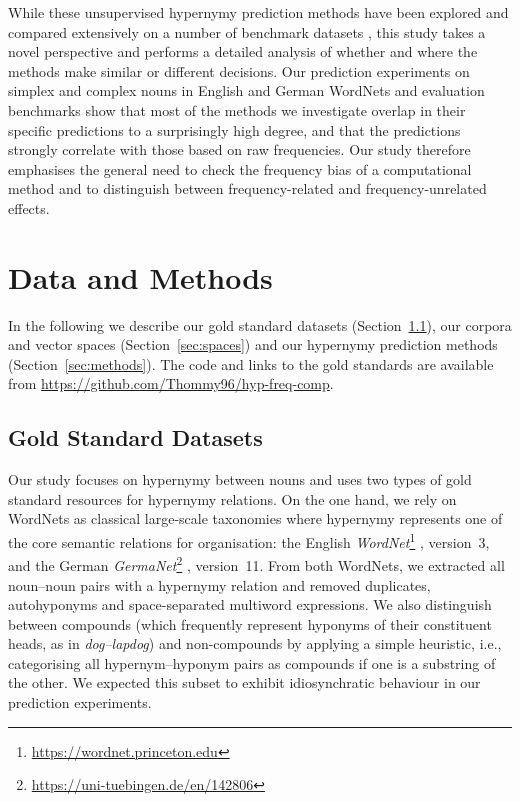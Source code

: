 \documentclass[11pt,a4paper]{article}
\begin{document}
While these unsupervised hypernymy prediction methods have been
explored and compared extensively on a number of benchmark datasets
\citep{ShwartzEtAl:17}, this study takes a novel perspective and
performs a detailed analysis of whether and where the methods make
similar or different decisions. Our prediction experiments on simplex
and complex nouns in English and German WordNets and evaluation
benchmarks show that most of the methods we investigate overlap in
their specific predictions to a surprisingly high degree, and that the
predictions strongly correlate with those based on raw
frequencies. Our study therefore emphasises the general need to check
the frequency bias of a computational method and to distinguish
between frequency-related and frequency-unrelated effects.


\section{Data and Methods}

In the following we describe our gold standard datasets (Section~\ref{sec:gs}), our corpora and vector spaces (Section~\ref{sec:spaces}) and our hypernymy prediction methods (Section~\ref{sec:methods}). The code and links to the gold standards are available from
\url{https://github.com/Thommy96/hyp-freq-comp}.

\subsection{Gold Standard Datasets}
\label{sec:gs}

Our study focuses on hypernymy between nouns and uses two types of
gold standard resources for hypernymy relations. On the one hand, we
rely on WordNets as classical large-scale taxonomies where hypernymy
represents one of the core semantic relations for organisation: the
English \textit{WordNet}\footnote{\url{https://wordnet.princeton.edu}}
\cite{MillerEtAl:90,Fellbaum:98}, version~3, and the German
\textit{GermaNet}\footnote{\url{https://uni-tuebingen.de/en/142806}}
\cite{Hamp/Feldweg:97,Kunze/Wagner:99,Lemnitzer/Kunze:07},
version~11. From both WordNets, we extracted all noun--noun pairs with
a hypernymy relation and removed duplicates, autohyponyms and
space-separated multiword expressions.  We also distinguish between
compounds (which frequently represent hyponyms of their constituent
heads, as in \textit{dog--lapdog}) and non-compounds by applying a
simple heuristic, i.e., categorising all hypernym--hyponym pairs as
compounds if one is a substring of the other.
We expected this subset to exhibit idiosynchratic behaviour in our
prediction experiments.
\end{document}
